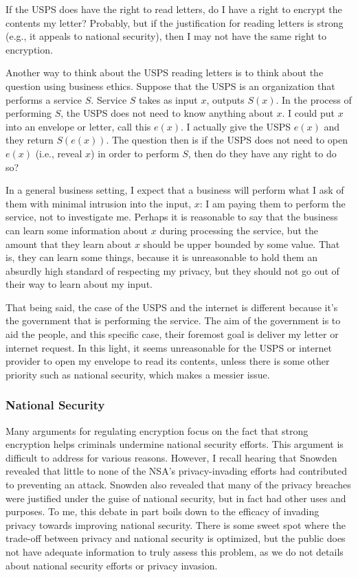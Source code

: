 \documentclass[11pt]{article}
\begin{document}
If the USPS does have the right to read letters, do I have a right to encrypt the contents my letter?
Probably, but if the justification for reading letters is strong (e.g., it appeals to national security), then I may not have the same right to encryption.

Another way to think about the USPS reading letters is to think about the question using business ethics.
Suppose that the USPS is an organization  that performs a service $S$.
Service $S$ takes as input $x$, outputs $S(x)$.
In the process of performing $S$, the USPS does not need to know anything about $x$.
I could put $x$ into an envelope or letter, call this $e(x)$.
I actually give the USPS $e(x)$ and they return $S(e(x))$.
The question then is if the USPS does not need to open $e(x)$ (i.e., reveal $x$) in order to perform $S$, then do they have any right to do so?

In a general business setting, I expect that a business will perform what I ask of them with minimal intrusion into the input, $x$: I am paying them to perform the service, not to investigate me.
Perhaps it is reasonable to say that the business can learn some information about $x$ during processing the service, but the amount that they learn about $x$ should be upper bounded by some value.
That is, they can learn some things, because it is unreasonable to hold them an absurdly high standard of respecting my privacy, but they should not go out of their way to learn about my input.

That being said, the case of the USPS and the internet is different because it's the government that is performing the service.
The aim of the government is to aid the people, and this specific case, their foremost goal is deliver my letter or internet request.
In this light, it seems unreasonable for the USPS or internet provider to open my envelope to read its contents, unless there is some other priority such as national security, which makes a messier issue.

\subsubsection{National Security}
Many arguments for regulating encryption focus on the fact that strong encryption helps criminals undermine national security efforts.
This argument is difficult to address for various reasons.
However, I recall hearing that Snowden revealed that little to none of the NSA's privacy-invading efforts had contributed to preventing an attack.
Snowden also revealed that many of the privacy breaches were justified under the guise of national security, but in fact had other uses and purposes.
To me, this debate in part boils down to the efficacy of invading privacy towards improving national security.
There is some sweet spot where the trade-off between privacy and national security is optimized, but the public does not have adequate information to truly assess this problem, as we do not details about national security efforts or privacy invasion.
\end{document}
